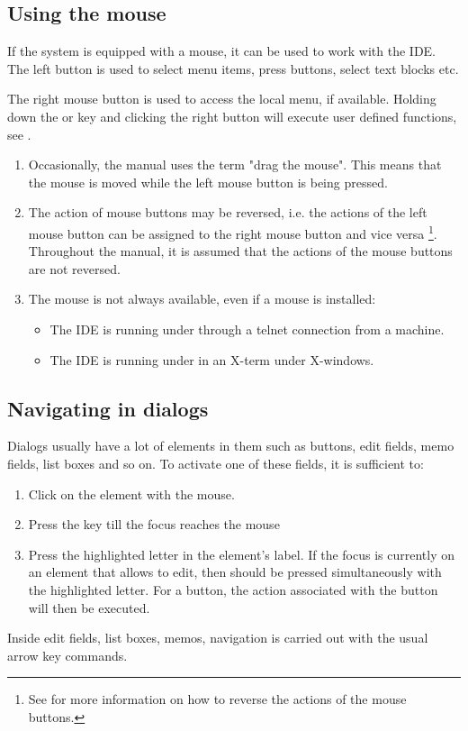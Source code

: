 \subsection{Using the mouse}
\label{suse:mouseusage}
If the system is equipped with a mouse, it can be used to work with the
IDE. The left button is used to select menu items, press buttons, select
text blocks etc. 

The right mouse button is used to access the local menu, if available.
Holding down the  or  key and clicking the right
button will execute user defined functions,  see .

\begin{remark}
\begin{enumerate}
\item Occasionally, the manual uses the term "drag the mouse". This
means that the mouse is moved while the left mouse button is being 
pressed.
\item 
The action of mouse buttons may be reversed, i.e. the actions of the left
mouse button can be assigned to the right mouse button and vice versa  
\footnote{See  for more information on how to reverse the
actions of the mouse buttons.}. Throughout the manual, it is assumed 
that the actions of the mouse buttons are not reversed.
\item
The mouse is not always available, even if a mouse is installed:
\begin{itemize}
\item The IDE is running under \linux through a telnet connection from 
a \windows machine.
\item The IDE is running under \linux in an X-term under X-windows.
\end{itemize}
\end{enumerate}
\end{remark}
%
% 
\subsection{Navigating in dialogs}
\label{se:navigatingdialogs}
Dialogs usually have a lot of elements in them such as buttons, edit fields,
memo fields, list boxes and so on. To activate one of these fields, it is
sufficient to:
\begin{enumerate}
\item Click on the element with the mouse.
\item Press the  key till the focus reaches the mouse
\item Press the highlighted letter in the element's label. If the focus
is currently on an element that allows to edit, then  should be
pressed simultaneously with the highlighted letter. For a button, the action
associated with the button will then be executed.
\end{enumerate}
Inside edit fields, list boxes, memos, navigation is carried out with the
usual arrow key commands.

